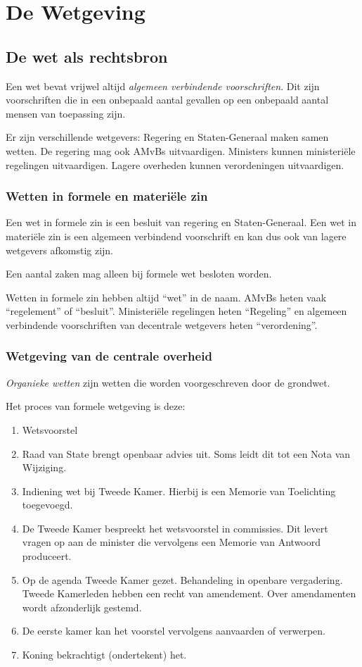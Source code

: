 \documentclass{article}
\begin{document}
\section{De Wetgeving}

\subsection{De wet als rechtsbron}

Een wet bevat vrijwel altijd \emph{algemeen verbindende voorschriften}. Dit
zijn voorschriften die in een onbepaald aantal gevallen op een onbepaald aantal
mensen van toepassing zijn.

Er zijn verschillende wetgevers: Regering en Staten-Generaal maken samen
wetten. De regering mag ook AMvBs uitvaardigen. Ministers kunnen ministeri\"ele
regelingen uitvaardigen. Lagere overheden kunnen verordeningen uitvaardigen.

\subsubsection{Wetten in formele en materi\"ele zin}

Een wet in formele zin is een besluit van regering en Staten-Generaal. Een wet
in materi\"ele zin is een algemeen verbindend voorschrift en kan dus ook van
lagere wetgevers afkomstig zijn.

Een aantal zaken mag alleen bij formele wet besloten worden.

Wetten in formele zin hebben altijd ``wet'' in de naam. AMvBs heten vaak
``regelement'' of ``besluit''. Ministeri\"ele regelingen heten ``Regeling'' en
algemeen verbindende voorschriften van decentrale wetgevers heten
``verordening''.

\subsubsection{Wetgeving van de centrale overheid}

\emph{Organieke wetten} zijn wetten die worden voorgeschreven door de grondwet.

Het proces van formele wetgeving is deze:

\begin{enumerate}
  \item Wetsvoorstel
  \item Raad van State brengt openbaar advies uit. Soms leidt dit tot een Nota van Wijziging.
  \item Indiening wet bij Tweede Kamer. Hierbij is een Memorie van Toelichting toegevoegd.
  \item De Tweede Kamer bespreekt het wetsvoorstel in commissies. Dit levert vragen op aan de minister
    die vervolgens een Memorie van Antwoord produceert.
  \item Op de agenda Tweede Kamer gezet. Behandeling in openbare vergadering. Tweede Kamerleden hebben
    een recht van amendement. Over amendamenten wordt afzonderlijk gestemd.
  \item De eerste kamer kan het voorstel vervolgens aanvaarden of verwerpen.
  \item Koning bekrachtigt (ondertekent) het.
\end{enumerate}
\end{document}
